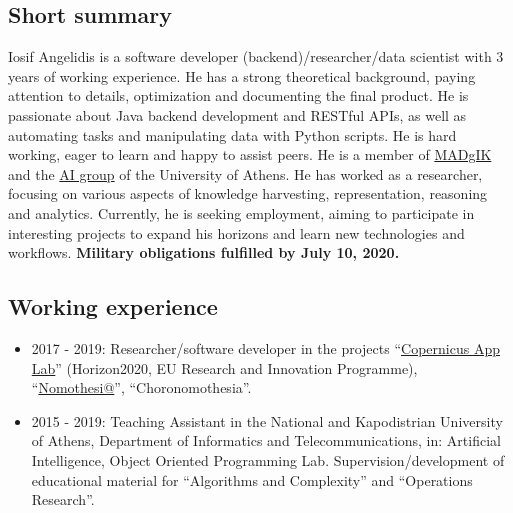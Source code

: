 \documentclass[a4paper,oneside,10pt]{article}
\begin{document}
\newpage

\subsection*{Short summary}

\begin{sloppypar}
	Iosif Angelidis is a software developer (backend)/researcher/data scientist with 3 years of working experience. He has a strong theoretical background, 
	paying attention to details, optimization and documenting the final product. He is passionate about Java backend development and RESTful APIs, 
	as well as automating tasks and manipulating data with Python scripts. He is hard working, eager to learn and happy to assist peers. 
	He is a member of \href{http://www.madgik.di.uoa.gr}{MADgIK} and the \href{http://ai.di.uoa.gr/}{AI group} of the University of Athens. 
	He has worked as a researcher, focusing on various aspects of knowledge harvesting, representation, reasoning and analytics. 
	Currently, he is seeking employment, aiming to participate in interesting projects to expand his horizons and learn new technologies and workflows. \textbf{Military obligations fulfilled by July 10, 2020.}
\end{sloppypar}

\subsection*{Working experience}

\begin{itemize}

	\item 2017 - 2019: Researcher/software developer in the projects ``\href{https://cordis.europa.eu/project/id/730124}{Copernicus App Lab}'' (Horizon2020, EU Research and Innovation Programme), ``\href{http://legislation.di.uoa.gr}{Nomothesi@}'', ``Choronomothesia''. 

	\item 2015 - 2019: Teaching Assistant in the National and Kapodistrian University of Athens, Department of Informatics and Telecommunications, in: Artificial Intelligence, Object Oriented Programming Lab. Supervision/development of educational material for ``Algorithms and Complexity'' and ``Operations Research''.

\end{itemize}
\end{document}
